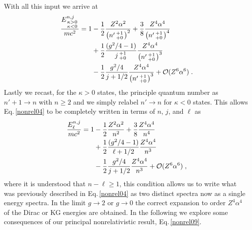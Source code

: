 \documentclass[epj]{svjour}
\begin{document}
With all this input we arrive at
\begin{alignat}{1}
\label{nonrel04} \frac{E^{n,j}_{\begin{smallmatrix}
\kappa>0 \\ \kappa<0
\end{smallmatrix}}}{mc^{2}}=1&-\frac{1}{2}\frac{Z^{2}\alpha^{2}}{\left(n'\begin{smallmatrix}
+1 \\ +0
\end{smallmatrix}\right)^{2}}+\frac{3}{8}\frac{Z^{4}\alpha^{4}}{\left(n'\begin{smallmatrix}
+1 \\ +0
\end{smallmatrix}\right)^{4}}
\\ \notag &+\frac{1}{2}
\frac{(g^{2}/4-1)}{j\begin{smallmatrix}
+1 \\ +0
\end{smallmatrix}}\frac{Z^{4}\alpha^{4}}{\left(n'\begin{smallmatrix}
+1 \\ +0
\end{smallmatrix}\right)^{3}}\\
\notag &-\frac{1}{2}\frac{g^{2}/4}{j+1/2}\frac{Z^{4}\alpha^{4}}{\left(n'\begin{smallmatrix}
+1 \\ +0
\end{smallmatrix}\right)^{3}}+\mathcal{O}(Z^{6}\alpha^{6})\;.
\end{alignat}
Lastly we recast, for the $\kappa>0$ states, the principle quantum number as $n'+1\rightarrow n$ with $n\geq2$ and we simply relabel $n'\rightarrow n$ for $\kappa<0$ states. This allows Eq.\,\eqref{nonrel04} to be completely written in terms of $n$, $j$, and $\ell$ as
\begin{alignat}{1}
\label{nonrel09} \frac{E^{n,j}_{\ell}}{mc^{2}}=1&-\frac{1}{2}\frac{Z^{2}\alpha^{2}}{n^{2}}+\frac{3}{8}\frac{Z^{4}\alpha^{4}}{n^{4}}\\
\notag &+\frac{1}{2}\frac{(g^{2}/4-1)}{\ell+1/2}\frac{Z^{4}\alpha^{4}}{n^{3}}\\
\notag &-\frac{1}{2}\frac{g^{2}/4}{j+1/2}\frac{Z^{4}\alpha^{4}}{n^{3}}+\mathcal{O}(Z^{6}\alpha^{6})\;,\end{alignat}
where it is understood that $n-\ell\geq1$, this condition allows us to write what was previously described in Eq.\,\eqref{nonrel04} as two distinct spectra now as a single energy spectra. In the limit $g\rightarrow2$ or $g\rightarrow0$ the correct expansion to order $Z^{4}\alpha^4$ of the Dirac or KG energies are obtained. In the following we explore some consequences of our principal nonrelativistic result, Eq.\,\eqref{nonrel09}.
\end{document}
